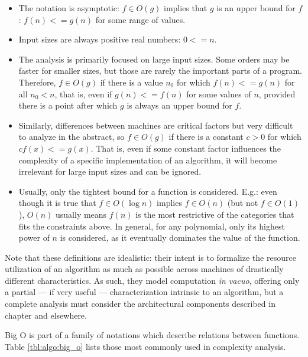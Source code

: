 \begin{itemize}
    \item
        The notation is asymptotic: $f \in O(g)$ implies that $g$ is an upper
        bound for $f$: $f(n) <= g(n)$ for some range of values.
    \item Input sizes are always positive real numbers: $0 <= n$.
    \item
        The analysis is primarily focused on large input sizes.  Some orders may
        be faster for smaller sizes, but those are rarely the important parts of
        a program.  Therefore, $f \in O(g)$ if there is a value $n_0$ for which
        $f(n) <= g(n)$ for all $n_0 < n$, that is, even if $g(n) <= f(n)$ for
        some values of $n$, provided there is a point after which $g$ is always
        an upper bound for $f$.
    \item
        Similarly, differences between machines are critical factors but very
        difficult to analyze in the abstract, so $f \in O(g)$ if there is a
        constant $c > 0$ for which $c f(x) <= g(x)$.  That is, even if some
        constant factor influences the complexity of a specific implementation
        of an algorithm, it will become irrelevant for large input sizes and can
        be ignored.
    \item
        Usually, only the tightest bound for a function is considered.  E.g.:
        even though it is true that $f \in O(\log{n})$ implies $f \in O(n)$ (but
        not $f \in O(1)$), $O(n)$ usually means $f(n)$ is the most restrictive
        of the categories that fits the constraints above.  In general, for any
        polynomial, only its highest power of $n$ is considered, as it
        eventually dominates the value of the function.
\end{itemize}

Note that these definitions are idealistic: their intent is to formalize the
resource utilization of an algorithm as much as possible across machines of
drastically different characteristics.  As such, they model computation \emph{in
vacuo}, offering only a partial --- if very useful --- characterization
intrinsic to an algorithm, but a complete analysis must consider the
architectural components described in chapter  and elsewhere.

Big O is part of a family of notations which describe relations between
functions.  Table \ref{tbl:algo:big_o} lists those most commonly used in
complexity analysis.

